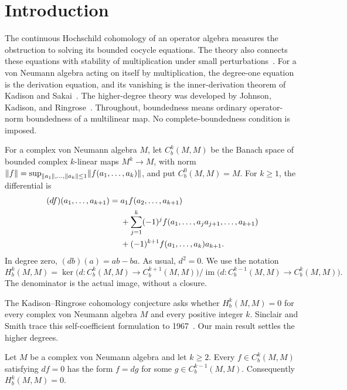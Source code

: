 \section{Introduction}\label{sec:introduction}

The continuous Hochschild cohomology of an operator algebra measures
the obstruction to solving its bounded cocycle equations. The theory
also connects these equations with stability of multiplication under
small perturbations~\cite[Chapter~7]{SinclairSmith1995}.
For a von Neumann algebra acting on itself by multiplication, the
degree-one equation is the derivation equation, and its vanishing is
the inner-derivation theorem of Kadison and
Sakai~\cite{Kadison1966,Sakai1966}.
The higher-degree theory was developed by Johnson, Kadison, and
Ringrose~\cite{KadisonRingrose1971,KadisonRingrose1971II,JKR1972}.
Throughout, boundedness means ordinary
operator-norm boundedness of a multilinear map. No complete-boundedness
condition is imposed.

For a complex von Neumann algebra \(M\), let \(C_b^k(M,M)\) be the
Banach space of bounded complex \(k\)-linear maps \(M^k\to M\),
with norm
$\lVert f\rVert=\sup_{\lVert a_1\rVert,\ldots,\lVert a_k\rVert\leq1}
\lVert f(a_1,\ldots,a_k)\rVert$, and put \(C_b^0(M,M)=M\).
For \(k\geq1\), the differential is
\begin{align}
(df)(a_1,\ldots,a_{k+1})
={}&a_1f(a_2,\ldots,a_{k+1})\notag\\
&+\sum_{j=1}^k(-1)^j
 f(a_1,\ldots,a_ja_{j+1},\ldots,a_{k+1})\notag\\
&+(-1)^{k+1}f(a_1,\ldots,a_k)a_{k+1}.
\label{eq:differential}
\end{align}
In degree zero, \((db)(a)=ab-ba\). As usual, \(d^2=0\).
We use the notation
\[
H_b^k(M,M)=
\ker\bigl(d:C_b^k(M,M)\to C_b^{k+1}(M,M)\bigr)
\big/
\operatorname{im}\bigl(d:C_b^{k-1}(M,M)\to C_b^k(M,M)\bigr).
\]
The denominator is the actual image, without a closure.

The Kadison--Ringrose cohomology conjecture asks whether
\(H_b^k(M,M)=0\) for every complex von Neumann algebra \(M\) and
every positive integer \(k\). Sinclair and Smith trace this
self-coefficient formulation to 1967~\cite[p.~3376]{SinclairSmith1998}.
Our main result settles the higher degrees.

\begin{theorem}\label{thm:main}
Let \(M\) be a complex von Neumann algebra and let \(k\geq2\).
Every \(f\in C_b^k(M,M)\) satisfying \(df=0\) has the form
\(f=dg\) for some \(g\in C_b^{k-1}(M,M)\).
Consequently \(H_b^k(M,M)=0\).
\end{theorem}

